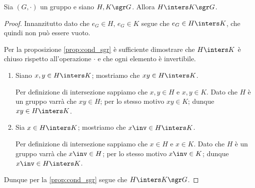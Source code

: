 \begin{proposition}
    Sia $(G, \cdot)$ un gruppo e siano $H, K \sgr G$.
    Allora $H \inters K \sgr G$.
\end{proposition}
\begin{proof}
    Innanzitutto dato che $e_G \in H$, $e_G \in K$ segue che $e_G \in H \inters K$, che quindi non può essere vuoto.

    Per la proposizione \ref{prop:cond_sgr} è sufficiente dimostrare che $H \inters K$ è chiuso rispetto all'operazione $\cdot$ e che ogni elemento è invertibile.

    \begin{enumerate}[label={(\roman*)}]
        \item Siano $x, y \in H \inters K$; mostriamo che $xy \in H \inters K$.
        
        Per definizione di intersezione sappiamo che $x, y \in H$ e $x, y \in K$. Dato che $H$ è un gruppo varrà che $xy \in H$; per lo stesso motivo $xy \in K$; dunque $xy \in H \inters K$.

        \item Sia $x \in H \inters K$; mostriamo che $x\inv \in H \inters K$.
        
        Per definizione di intersezione sappiamo che $x \in H$ e $x \in K$. Dato che $H$ è un gruppo varrà che $x\inv \in H$; per lo stesso motivo $x\inv \in K$; dunque $x\inv \in H \inters K$.
    \end{enumerate}

    Dunque per la \autoref{prop:cond_sgr} segue che $H \inters K \sgr G$.
\end{proof}